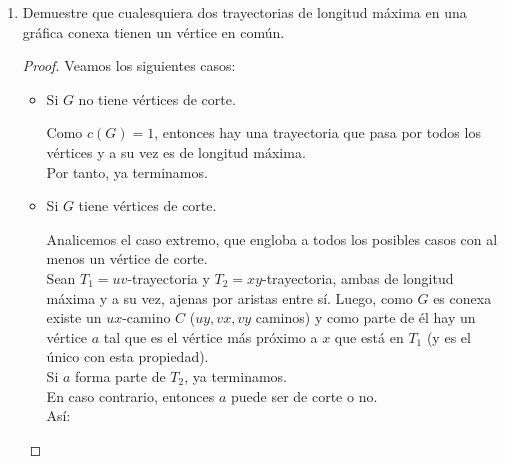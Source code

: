 \documentclass{article}
\begin{document}
\begin{enumerate}
      \renewcommand\qedsymbol{QED}
      \begin{proof}
        Procedamos por reducción al absurdo.

        Sea $G$ una gráfica completa, entonces $P_{3}$ es subgráfica de $G$. \\
        Para este ejercicio necesitamos de una condición, $V_G \ge 3$, para las gráficas que no
        cumplan esto se tendrá la demostración por vacuidad.

        Tomemos a $x_{i - 1}, x_{i}, x_{i + 1}$ en $V_{G}$ ($2 \ge i \ge
        |V_{G}| - 1$). Como $G$ es completa, se tiene que la distancia entre cualesquiera
        $2$ v\'ertices es $1$. Luego, tenemos que hay ${3 \choose 2}$ aristas!! y esto es
        claramente mayor que $2$ ($|E_{P_3}|$). Como los v\'ertices que tomamos son arbitrarios,
        podemos concluir que $P_{3} \nsubseteq G$.

        Como la anterior contradicci\'on resulta de suponer a $G$ completa, podemos
        asegurar que si $G$ no es completa, entonces $P_3 \subseteq G$.
      \end{proof}

    \item Demuestre que cualesquiera dos trayectorias de longitud m\'axima en una
      gr\'afica conexa tienen un vértice en común.

      \renewcommand\qedsymbol{QED}
      \begin{proof}
        Veamos los siguientes casos:

        \begin{itemize}
          \item Si $G$ no tiene vértices de corte.

            Como $c(G) = 1$, entonces hay una trayectoria que pasa por todos los vértices
            y a su vez es de longitud máxima. \\
            Por tanto, ya terminamos.

          \item Si $G$ tiene vértices de corte.

            Analicemos el caso extremo, que engloba a todos los posibles casos con al menos
            un vértice de corte. \\
            Sean $T_{1} = uv$-trayectoria y $T_{2} = xy$-trayectoria, ambas de longitud
            máxima y a su vez, ajenas por aristas entre sí. Luego, como $G$ es conexa existe
            un $ux$-camino $C$ ($uy, vx, vy$ caminos) y como parte de él hay un vértice $a$
            tal que es el vértice más próximo a $x$ que está en $T_{1}$ (y es el único con esta
            propiedad). \\
            Si $a$ forma parte de $T_{2}$, ya terminamos. \\
            En caso contrario, entonces $a$ puede ser de corte o no. \\
            Así:


\end{itemize}
\end{proof}
\end{enumerate}
\end{document}
